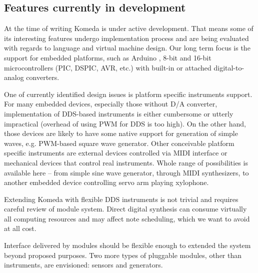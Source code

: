 \documentclass{article}
\begin{document}
\subsection{Features currently in development}

At the time of writing Komeda is under active development. That means some of
its interesting features undergo implementation process and are being evaluated
with regards to language and virtual machine design. Our long term focus is the
support for embedded platforms, such as Arduino \cite{arduino}, 8-bit and 16-bit
microcontrollers (PIC, DSPIC, AVR, etc.) with built-in or attached
digital-to-analog converters.

One of currently identified design issues is platform specific instruments
support. For many embedded devices, especially those without D/A converter,
implementation of DDS-based instruments is either cumbersome or utterly
impractical (overhead of using PWM for DDS is too high).  On the other hand,
those devices are likely to have some native support for generation of simple
waves, e.g. PWM-based square wave generator. Other conceivable platform
specific instruments are external devices controlled via MIDI interface or
mechanical devices that control real instruments. Whole range of possibilities
is available here -- from simple sine wave generator, through MIDI
synthesizers, to another embedded device controlling servo arm playing
xylophone.

Extending Komeda with flexible DDS instruments is not trivial and requires
careful review of module system.  Direct digital synthesis can consume
virtually all computing resources and may affect note scheduling, which we want
to avoid at all cost.

Interface delivered by modules should be flexible enough to extended the system
beyond proposed purposes.  Two more types of pluggable modules, other than
instruments, are envisioned: sensors and generators.
\end{document}
